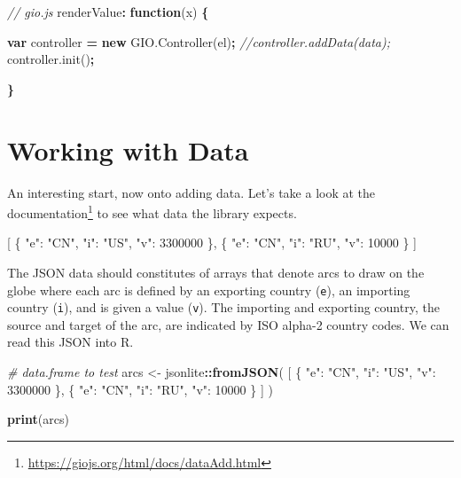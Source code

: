 \documentclass[
]{krantz}
\makeatletter
\newenvironment{Shaded}{\begin{snugshade}}{\end{snugshade}}
\newcommand{\AttributeTok}[1]{\textcolor[rgb]{0.61,0.61,0.61}{#1}}
\newcommand{\CommentTok}[1]{\textcolor[rgb]{0.37,0.37,0.37}{\textit{#1}}}
\newcommand{\DataTypeTok}[1]{\textcolor[rgb]{0.27,0.27,0.27}{#1}}
\newcommand{\DecValTok}[1]{\textcolor[rgb]{0.06,0.06,0.06}{#1}}
\newcommand{\FunctionTok}[1]{\textcolor[rgb]{0,0,0}{#1}}
\newcommand{\KeywordTok}[1]{\textcolor[rgb]{0.27,0.27,0.27}{\textbf{#1}}}
\newcommand{\NormalTok}[1]{#1}
\newcommand{\OperatorTok}[1]{\textcolor[rgb]{0.43,0.43,0.43}{\textbf{#1}}}
\newcommand{\OtherTok}[1]{\textcolor[rgb]{0.37,0.37,0.37}{#1}}
\newcommand{\StringTok}[1]{\textcolor[rgb]{0.5,0.5,0.5}{#1}}
\newcommand{\VariableTok}[1]{\textcolor[rgb]{0,0,0}{#1}}
\renewcommand{\href}[2]{#2\footnote{\url{#1}}}
\newenvironment{kframe}{%
\medskip{}
\setlength{\fboxsep}{.8em}
 \def\at@end@of@kframe{}%
 \ifinner\ifhmode%
  \def\at@end@of@kframe{\end{minipage}}%
  \begin{minipage}{\columnwidth}%
 \fi\fi%
 \def\FrameCommand##1{\hskip\@totalleftmargin \hskip-\fboxsep
 \colorbox{shadecolor}{##1}\hskip-\fboxsep
     \hskip-\linewidth \hskip-\@totalleftmargin \hskip\columnwidth}%
 \MakeFramed {\advance\hsize-\width
   \@totalleftmargin\z@ \linewidth\hsize
   \@setminipage}}%
 {\par\unskip\endMakeFramed%
 \at@end@of@kframe}
\renewenvironment{Shaded}{\begin{kframe}}{\end{kframe}}
\makeatother
\begin{document}
\begin{Shaded}
\begin{Highlighting}[]
\CommentTok{// gio.js}
\NormalTok{renderValue}\OperatorTok{:} \KeywordTok{function}\NormalTok{(x) }\OperatorTok{\{}

  \KeywordTok{var}\NormalTok{ controller }\OperatorTok{=} \KeywordTok{new} \VariableTok{GIO}\NormalTok{.}\AttributeTok{Controller}\NormalTok{(el)}\OperatorTok{;}
  \CommentTok{//controller.addData(data);}
  \VariableTok{controller}\NormalTok{.}\AttributeTok{init}\NormalTok{()}\OperatorTok{;}

\OperatorTok{\}}
\end{Highlighting}
\end{Shaded}

\hypertarget{working-with-data}{%
\section{Working with Data}\label{working-with-data}}

An interesting start, now onto adding data. Let's take a look at the \href{https://giojs.org/html/docs/dataAdd.html}{documentation} to see what data the library expects.

\begin{Shaded}
\begin{Highlighting}[]
\OtherTok{[}
  \FunctionTok{\{}
    \DataTypeTok{"e"}\FunctionTok{:} \StringTok{"CN"}\FunctionTok{,}
    \DataTypeTok{"i"}\FunctionTok{:} \StringTok{"US"}\FunctionTok{,}
    \DataTypeTok{"v"}\FunctionTok{:} \DecValTok{3300000}
  \FunctionTok{\}}\OtherTok{,}
  \FunctionTok{\{}
    \DataTypeTok{"e"}\FunctionTok{:} \StringTok{"CN"}\FunctionTok{,}
    \DataTypeTok{"i"}\FunctionTok{:} \StringTok{"RU"}\FunctionTok{,}
    \DataTypeTok{"v"}\FunctionTok{:} \DecValTok{10000}
  \FunctionTok{\}}
\OtherTok{]}
\end{Highlighting}
\end{Shaded}

The JSON data should constitutes of arrays that denote arcs to draw on the globe where each arc is defined by an exporting country (\texttt{e}), an importing country (\texttt{i}), and is given a value (\texttt{v}). The importing and exporting country, the source and target of the arc, are indicated by ISO alpha-2 country codes. We can read this JSON into R.

\begin{Shaded}
\begin{Highlighting}[]
\CommentTok{\# data.frame to test}
\NormalTok{arcs <{-}}\StringTok{ }\NormalTok{jsonlite}\OperatorTok{::}\KeywordTok{fromJSON}\NormalTok{(}
  \StringTok{\textquotesingle{}[}
\StringTok{    \{}
\StringTok{      "e": "CN",}
\StringTok{      "i": "US",}
\StringTok{      "v": 3300000}
\StringTok{    \},}
\StringTok{    \{}
\StringTok{      "e": "CN",}
\StringTok{      "i": "RU",}
\StringTok{      "v": 10000}
\StringTok{    \}}
\StringTok{  ]\textquotesingle{}}
\NormalTok{)}

\KeywordTok{print}\NormalTok{(arcs)}
\end{Highlighting}
\end{Shaded}
\end{document}
